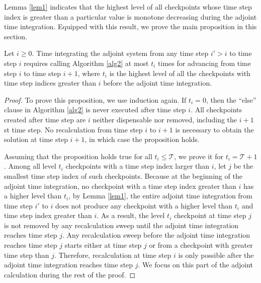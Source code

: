 \documentclass[oneeqnum, onethmnum, onefignum, onetabnum]{siamltex}
\begin{document}
Lemma \ref{lem1} indicates that the highest level of all checkpoints whose
time step index is greater than a particular value is monotone decreasing
during the adjoint time integration.  Equipped with this result, we prove the
main proposition in this section.

\begin{proposition} \label{thm2}
    Let $i \ge 0$.  Time integrating the adjoint system from any time
    step $i' > i$ to time step $i$ requires calling Algorithm \ref{alg2} at
    most $t_i$ times for advancing from time step $i$ to time step $i + 1$,
    where $t_i$ is the highest level of all the checkpoints with time step
    indices greater than $i$ before the adjoint time integration.
\end{proposition}
\begin{proof}
To prove this proposition, we use induction again.
If $t_i = 0$, then the ``else'' clause in Algorithm \ref{alg2} is
never executed after time step $i$.  All checkpoints created after time step
are $i$ neither dispensable nor removed, including the $i + 1$st time step.
No recalculation from time step $i$ to $i + 1$ is necessary to obtain the
solution at time step $i + 1$, in which case the proposition holds.

Assuming that the proposition holds true for all $t_i \le \mathcal{T}$, we
prove it for $t_i = \mathcal{T} + 1$.  Among all level
$t_i$ checkpoints with a time step index larger than $i$, let $j$ be the
smallest
time step index of such checkpoints.  Because at the beginning of the adjoint
time integration, no checkpoint with a time step index greater than $i$ has
a higher level
than $t_i$, by Lemma \ref{lem1}, the entire adjoint time integration from
time step $i'$ to $i$ does not produce any checkpoint with a higher level than
$t_i$ and time step index greater than $i$.  As a result, the level $t_i$
checkpoint at time step $j$ is not removed by any recalculation sweep until
the adjoint time integration reaches time step $j$.
Any recalculation sweep before the adjoint time integration reaches time step
$j$ starts either at time step $j$ or from a checkpoint with greater time
step than $j$.  Therefore, recalculation at time step $i$ is only possible
after the adjoint time integration reaches time step $j$.  We focus on this
part of the adjoint calculation during the rest of the proof.


\end{proof}
\end{document}
